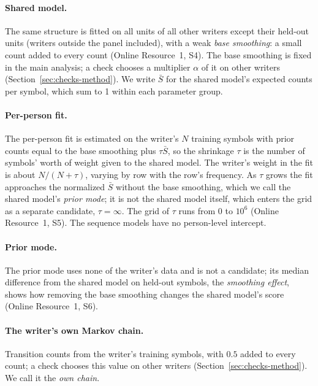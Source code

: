 \documentclass[pdflatex,sn-basic]{sn-jnl}
\newcommand{\Sref}[1]{Online Resource~1, S#1}
\begin{document}
\paragraph{Shared model.} The same structure is fitted on all units of all other writers except their held-out units (writers outside the panel included), with a weak \emph{base smoothing}: a small count added to every count (\Sref{4}). The base smoothing is fixed in the main analysis; a check chooses a multiplier $\alpha$ of it on other writers (Section~\ref{sec:checks-method}). We write $\bar S$ for the shared model's expected counts per symbol, which sum to 1 within each parameter group.

\paragraph{Per-person fit.} The per-person fit is estimated on the writer's $N$ training symbols with prior counts equal to the base smoothing plus $\tau\bar S$, so the shrinkage $\tau$ is the number of symbols' worth of weight given to the shared model. The writer's weight in the fit is about $N/(N+\tau)$, varying by row with the row's frequency. As $\tau$ grows the fit approaches the normalized $\bar S$ without the base smoothing, which we call the shared model's \emph{prior mode}; it is not the shared model itself, which enters the grid as a separate candidate, $\tau=\infty$. The grid of $\tau$ runs from 0 to $10^6$ (\Sref{5}). The sequence models have no person-level intercept.

\paragraph{Prior mode.} The prior mode uses none of the writer's data and is not a candidate; its median difference from the shared model on held-out symbols, the \emph{smoothing effect}, shows how removing the base smoothing changes the shared model's score (\Sref{6}).

\paragraph{The writer's own Markov chain.} Transition counts from the writer's training symbols, with $0.5$ added to every count; a check chooses this value on other writers (Section~\ref{sec:checks-method}). We call it the \emph{own chain}.
\end{document}
